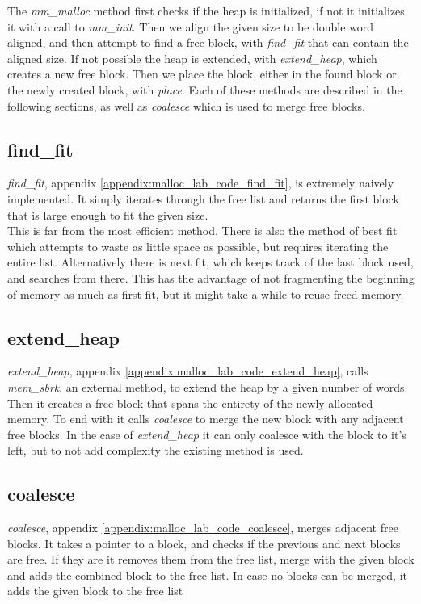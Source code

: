 \documentclass[11pt]{report}
\begin{document}
The \textit{mm\_malloc} method first checks if the heap is initialized, if not it initializes it with a call to \textit{mm\_init}. Then we align the given size to be double word aligned, and then attempt to find a free block, with \textit{find\_fit} that can contain the aligned size. If not possible the heap is extended, with \textit{extend\_heap}, which creates a new free block. Then we place the block, either in the found block or the newly created block, with \textit{place}. Each of these methods are described in the following sections, as well as \textit{coalesce} which is used to merge free blocks. 

\subsection{find\_fit}
\textit{find\_fit}, appendix \ref{appendix:malloc_lab_code_find_fit}, is extremely naively implemented. It simply iterates through the free list and returns the first block that is large enough to fit the given size.\\[1ex]

This is far from the most efficient method. There is also the method of best fit which attempts to waste as little space as possible, but requires iterating the entire list. Alternatively there is next fit, which keeps track of the last block used, and searches from there. This has the advantage of not fragmenting the beginning of memory as much as first fit, but it might take a while to reuse freed memory.

\subsection{extend\_heap}
\textit{extend\_heap}, appendix \ref{appendix:malloc_lab_code_extend_heap}, calls \textit{mem\_sbrk}, an external method, to extend the heap by a given number of words. Then it creates a free block that spans the entirety of the newly allocated memory. To end with it calls \textit{coalesce} to merge the new block with any adjacent free blocks. In the case of \textit{extend\_heap} it can only coalesce with the block to it's left, but to not add complexity the existing method is used.\\[1ex]

\subsection{coalesce}
\textit{coalesce}, appendix \ref{appendix:malloc_lab_code_coalesce}, merges adjacent free blocks. It takes a pointer to a block, and checks if the previous and next blocks are free. If they are it removes them from the free list, merge with the given block and adds the combined block to the free list. In case no blocks can be merged, it adds the given block to the free list\\[1ex]
\end{document}
